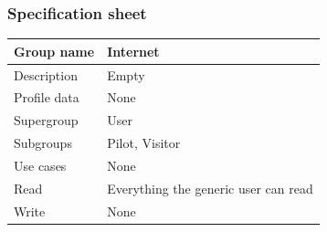 \documentclass{beamer}
\begin{document}
\begin{frame}
    \frametitle{Specification sheet}
    \begin{table}
        \tiny
        \begin{tabular}{|p{2cm}|p{6cm}|}
        \hline
        Group name & \textbf{Internet} \\
        \hline
        Description & Empty \\
        \hline
        Profile data & None \\
        Supergroup & User \\
        \hline
        Subgroups & Pilot, Visitor \\
        \hline
        Use cases & None \\
        \hline
        Read & Everything the generic user can read \\
        \hline
        Write & None \\
        \hline
        \end{tabular}
    \end{table}
\end{frame}
\end{document}
